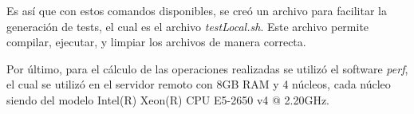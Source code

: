 Es así que con estos comandos disponibles, se creó un archivo para facilitar la generación de tests, el cual es el archivo \textit{testLocal.sh}. Este archivo permite compilar, ejecutar, y limpiar los archivos de manera correcta.

Por último, para el cálculo de las operaciones realizadas se utilizó el software \textit{perf}, el cual se utilizó en el servidor remoto con 8GB RAM y 4 núcleos, cada núcleo siendo del modelo Intel(R) Xeon(R) CPU E5-2650 v4 @ 2.20GHz. 